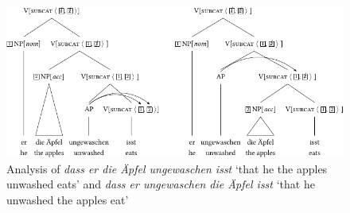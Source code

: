 \begin{figure}
\includegraphics[width=\textwidth]{Figures/depictives-lsp-cropped.pdf}
\caption{Analysis of \emph{dass er die Äpfel ungewaschen isst} `that he the apples unwashed eats' and \emph{dass er ungewaschen die
    Äpfel isst} `that he unwashed the apples eat'}\label{anal-er-die-frau-nackt-sieht}
\end{figure}%

